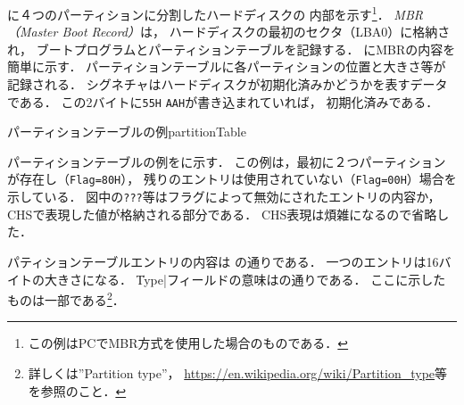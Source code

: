 \begin{enumerate}
 に４つのパーティションに分割したハードディスクの
  内部を示す\footnote{この例はPCでMBR方式を使用した場合のものである．}．
  \emph{MBR（Master Boot Record）}は，
  ハードディスクの最初のセクタ（LBA0）に格納され，
  ブートプログラムとパーティションテーブルを記録する．
  にMBRの内容を簡単に示す．
  パーティションテーブルに各パーティションの位置と大きさ等が記録される．
  シグネチャはハードディスクが初期化済みかどうかを表すデータである．
  この2バイトに\texttt{55H} \texttt{AAH}が書き込まれていれば，
  初期化済みである．
  
           {パーティションテーブルの例}{partitionTable}

  パーティションテーブルの例をに示す．
  この例は，最初に２つパーティションが存在し（\texttt{Flag=80H}），
  残りのエントリは使用されていない（\texttt{Flag=00H}）場合を示している．
  図中の\texttt{???}等はフラグによって無効にされたエントリの内容か，
  CHSで表現した値が格納される部分である．
  CHS表現は煩雑になるので省略した．

  パティションテーブルエントリの内容は
  の通りである．
  一つのエントリは16バイトの大きさになる．
  \|Type|フィールドの意味はの通りである．
  ここに示したものは一部である\footnote{
    詳しくは''Partition type''，
    \url{https://en.wikipedia.org/wiki/Partition_type}等を参照のこと．}．


\end{enumerate}
